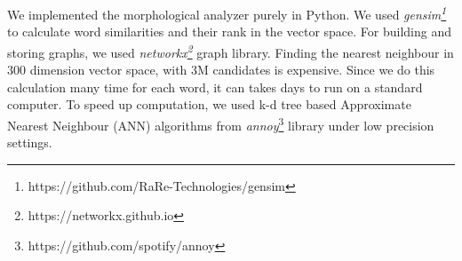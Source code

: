 We implemented the morphological analyzer purely in Python. We used \textit{gensim\footnote{https://github.com/RaRe-Technologies/gensim}} to calculate word similarities and their rank in the vector space. For building and storing graphs, we used \textit{networkx\footnote{https://networkx.github.io}} graph library. Finding the nearest neighbour in 300 dimension vector space, with 3M candidates is expensive. Since we do this calculation many time for each word, it can takes days to run on a standard computer. To speed up computation, we used k-d tree based Approximate Nearest Neighbour (ANN) algorithms from \textit{annoy}\footnote{https://github.com/spotify/annoy} library under low precision settings.

